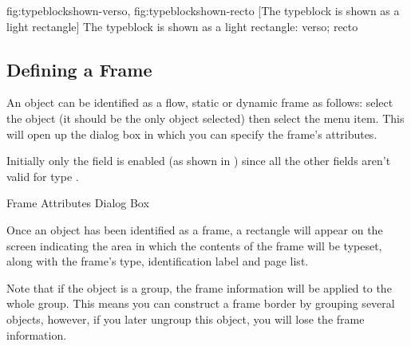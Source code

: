 {
 {fig:typeblockshown-verso}{}{},
 {fig:typeblockshown-recto}{}{}
}
[The typeblock is shown as a light  rectangle]
{The typeblock is shown as a light  rectangle:
 verso;
 recto}

\subsection{Defining a Frame}\label{sec:framedef}


An \gls{object} can be identified as a flow, static or
dynamic frame as follows: select the \gls{object} (it should
be the only \gls*{object} selected) then select the
 menu item.
This will open up the  dialog box in which you can specify the frame's
attributes. 


Initially only the  field
is enabled (as shown in ) since all the other
fields aren't valid for type .


{}
{Frame Attributes Dialog Box}

Once an \gls*{object} has been identified as a frame, a
 rectangle will appear on the screen indicating the area in
which the contents of the frame will be typeset, along with the
frame's type, identification label and page list.

\begin{information}
Note that if the \gls*{object} is a \gls{group}, the frame
information will be applied to the whole group. This means you can
construct a frame border by grouping several objects, however, if
you later ungroup this \gls*{object}, you will lose the frame
information.
\end{information}


